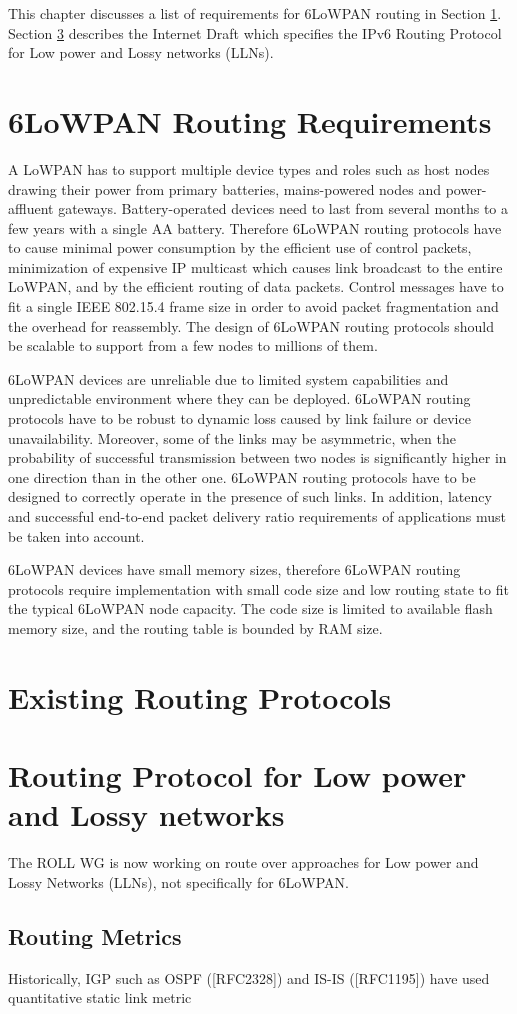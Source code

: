 This chapter discusses a list of requirements for 6LoWPAN routing \cite{draft-routing-04} in Section \ref{sec:rout.req}. Section \ref{sec:rout.rpl} describes the Internet Draft \cite{draft-rpl-04} which specifies the IPv6 Routing Protocol for Low power and Lossy networks (LLNs).

\section{6LoWPAN Routing Requirements}\label{sec:rout.req}
A LoWPAN has to support multiple device types and roles such as host nodes drawing their power from primary batteries, mains-powered nodes and power-affluent gateways. Battery-operated devices need to last from several months to a few years with a single AA battery. Therefore 6LoWPAN routing protocols have to cause minimal power consumption by the efficient use of control packets, minimization of expensive IP multicast which causes link broadcast to the entire LoWPAN, and by the efficient routing of data packets. Control messages have to fit a single IEEE 802.15.4 frame size in order to avoid packet fragmentation and the overhead for reassembly. The design of 6LoWPAN routing protocols should be scalable to support from a few nodes to millions of them.

6LoWPAN devices are unreliable due to limited system capabilities and unpredictable environment where they can be deployed. 6LoWPAN routing protocols have to be robust to dynamic loss caused by link failure or device unavailability. Moreover, some of the links may be asymmetric, when the probability of successful transmission between two nodes is significantly higher in one direction than in the other one. 6LoWPAN routing protocols have to be designed to correctly operate in the presence of such links.  In addition, latency and successful end-to-end packet delivery ratio requirements of applications must be taken into account.

6LoWPAN devices have small memory sizes, therefore 6LoWPAN routing protocols require implementation with small code size and low routing state to fit the typical 6LoWPAN node capacity. The code size is limited to available flash memory size, and the routing table is bounded by RAM size. 

\section{Existing Routing Protocols}

\section{Routing Protocol for Low power and Lossy networks}\label{sec:rout.rpl}
The ROLL WG is now working on route over approaches for Low power and Lossy Networks (LLNs), not specifically for 6LoWPAN. 
\subsection{Routing Metrics}
Historically, IGP such as OSPF ([RFC2328]) and IS-IS ([RFC1195]) have used quantitative static link metric


